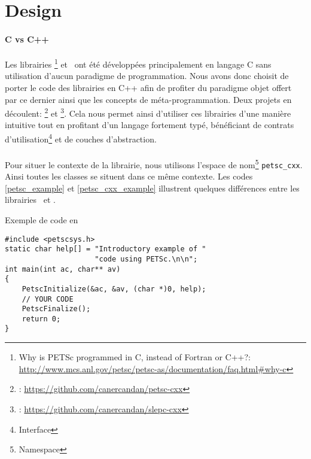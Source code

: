%

\section{Design}

\paragraph{C vs C++}

Les librairies \petsc\footnote{Why is PETSc programmed in C, instead of Fortran or C++?: \url{http://www.mcs.anl.gov/petsc/petsc-as/documentation/faq.html#why-c}} et \slepc\ ont été développées principalement en langage C sans utilisation d'aucun paradigme de programmation. Nous avons donc choisit de porter le code des librairies en C++ afin de profiter du paradigme objet offert par ce dernier ainsi que les concepts de méta-programmation. Deux projets en découlent: \petscx\footnote{\petscx: \url{https://github.com/canercandan/petsc-cxx}} et \slepcx\footnote{\slepcx: \url{https://github.com/canercandan/slepc-cxx}}. Cela nous permet ainsi d'utiliser ces librairies d'une manière intuitive tout en profitant d'un langage fortement typé, bénéficiant de contrats d'utilisation\footnote{Interface} et de couches d'abstraction.

\paragraph{\petscx}

Pour situer le contexte de la librairie, nous utilisons l'espace de nom\footnote{Namespace} \verb#petsc_cxx#. Ainsi toutes les classes se situent dans ce même contexte. Les codes \ref{petsc_example} et \ref{petsc_cxx_example} illustrent quelques différences entre les librairies \petsc\ et \petscx.

\begin{algorithm}[h]
  \caption{Exemple de code en \petsc}
  \label{petsc_example}
\begin{verbatim}
#include <petscsys.h>
static char help[] = "Introductory example of "
                     "code using PETSc.\n\n";
int main(int ac, char** av)
{
    PetscInitialize(&ac, &av, (char *)0, help);
    // YOUR CODE
    PetscFinalize();
    return 0;
}
\end{verbatim}
\end{algorithm}

